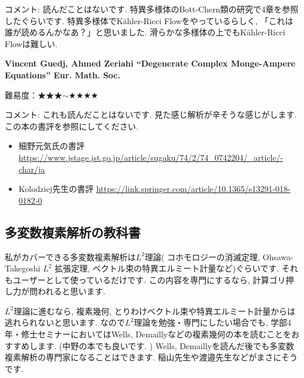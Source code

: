 コメント: 読んだことはないです. 特異多様体のBott-Chern類の研究で4章を参照したぐらいです. 特異多様体でKähler-Ricci Flowをやっているらしく, 「これは誰が読めるんかなあ？」と思いました. 滑らかな多様体の上でもKähler-Ricci Flowは難しい. 

\textbf{Vincent Guedj, Ahmed Zeriahi “Degenerate Complex Monge-Ampere Equations”  Eur. Math. Soc.}
 \vspace{-6pt} 

難易度：★★★$\sim$★★★★ \vspace{-6pt} 

コメント: これも読んだことはないです. 見た感じ解析が辛そうな感じがします. この本の書評を参照にしてください. 
\vspace{-8pt}
\begin{itemize}[left=0pt]
  \setlength{\parskip}{0cm} %
  \setlength{\itemsep}{0cm} %
\item 細野元気氏の書評 \url{https://www.jstage.jst.go.jp/article/sugaku/74/2/74_0742204/_article/-char/ja}
\item Kolodziej先生の書評 \url{https://link.springer.com/article/10.1365/s13291-018-0182-0}
\end{itemize}
\subsection{多変数複素解析の教科書}

私がカバーできる多変数複素解析は$L^2$理論( コホモロジーの消滅定理, Ohsawa-Takegoshi $L^2$ 拡張定理, ベクトル束の特異エルミート計量など)ぐらいです. 
それもユーザーとして使っているだけです. 
この内容を専門にするなら, 計算ゴリ押し力が問われると思います. 

$L^2$理論に進むなら, 複素幾何, とりわけベクトル束や特異エルミート計量からは逃れられないと思います. 
なので$L^2$理論を勉強・専門にしたい場合でも, 学部4年・修士セミナーにおいてはWells, Demaillyなどの複素幾何の本を読むことをおすすめします. (中野の本でも良いです. )
Wells, Demaillyを読んだ後でも多変数複素解析の専門家になることはできます. 稲山先生や渡邉先生などがまさにそうです. 

